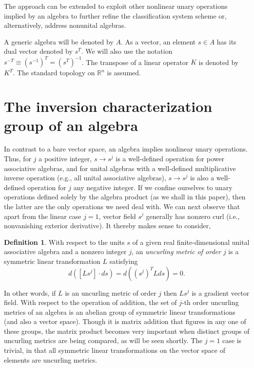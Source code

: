 \documentclass{amsart}
\numberwithin{equation}{section}
\theoremstyle{definition}
\newtheorem{definition}{Definition}[section]
\numberwithin{theorem}{section}
\begin{document}
  The approach can be extended to exploit other nonlinear unary operations implied by an algebra to further refine the classification system scheme or, alternatively, address nonunital algebras.
      
      
  
  \bigskip
  
     A generic algebra will be denoted by $A$.  As a vector, an element $s\in A$ has its dual vector denoted by $s^T$.  We will also use the notation $s^{-T} \equiv (s^{-1})^T = (s^T)^{-1}$.  The transpose of a linear operator $K$ is denoted by $K^T$.  The standard topology on $\mathbb{R}^n$ is assumed.
   
   \section{The inversion characterization group of an algebra}

  In contrast to a bare vector space, an algebra implies nonlinear unary operations.  Thus, for $j$ a positive integer, $s\rightarrow s^j$ is a well-defined operation for power associative algebras, and for unital algebras with a well-defined multiplicative inverse operation (e.g., all unital associative algebras), $s\rightarrow s^j$ is also a well-defined operation for $j$ any negative integer.  If we confine ourselves to unary operations defined solely by the algebra product (as we shall in this paper), then the latter are the only operations we need deal with.  We can next observe that apart from the linear case $j=1$, vector field $s^j$ generally has nonzero curl (i.e., nonvanishing exterior derivative).    It thereby makes sense to consider,
   
   \begin{definition}\label{7/21/23.1} With respect to the units $s$ of a given real finite-dimensional unital associative algebra and a nonzero integer $j$, an {\it uncurling metric of order $j$} is a symmetric linear transformation $L$ satisfying \begin{equation}\nonumber d([Ls^j]\cdot ds) = d\left((s^j)^T L ds\right) = 0. \end{equation}   \end{definition}
   
   In other words, if $L$ is an uncurling metric of order $j$ then $Ls^j$ is a gradient vector field.  With respect to the operation of addition, the set of $j$-th order uncurling metrics of an algebra is an abelian group of symmetric linear transformations (and also a vector space).  Though it is matrix addition that figures in any one of these groups, the matrix product becomes very important when distinct groups of uncurling metrics are being compared, as will be seen shortly.   The $j=1$ case is trivial, in that all symmetric linear transformations on the vector space of elements are uncurling metrics.
   
\end{document}
